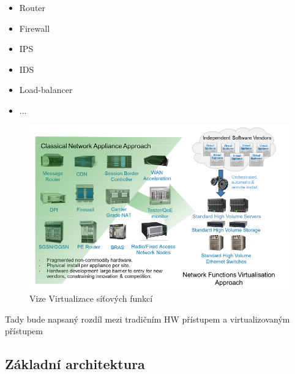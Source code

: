 \begin{itemize}
\item Router
\item Firewall
\item IPS
\item IDS
\item Load-balancer
\item ...
\end{itemize}

\begin{figure}[h]
\begin{centering}
\includegraphics[scale=0.5]{images/vize_NFV}
\par\end{centering}
\caption{Vize Virtualizace síťových funkcí\label{fig:vize_NFV}}
\end{figure}

Tady bude napsaný rozdíl mezi tradičním HW přístupem a virtualizovaným přístupem

\subsection{Základní architektura}\label{sub:interaction}


